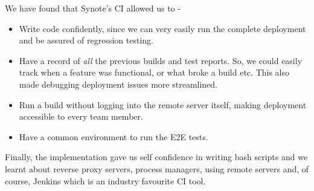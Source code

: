 We have found that Synote's CI allowed us to -

\begin{itemize}

  \item Write code confidently, since we can very easily run the complete deployment and be assured of regression testing.

  \item Have a record of \textit{all} the previous builds and test reports. So, we could easily track when a feature was functional, or what broke a build etc. This also made debugging deployment issues more streamlined.

  \item Run a build without logging into the remote server itself, making deployment accessible to every team member.

  \item Have a common environment to run the E2E tests.

\end{itemize}

Finally, the implementation gave us self confidence in writing bash scripts and we learnt about reverse proxy servers, process managers, using remote servers and, of course, Jenkins which is an industry favourite CI tool.
